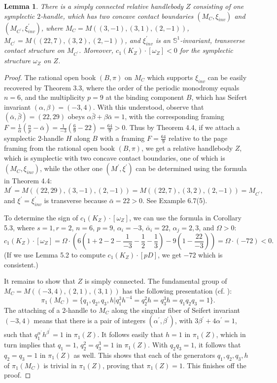 \documentclass[11pt]{amsart}
\theoremstyle{plain}
\numberwithin{theorem}{section}
\newtheorem{lemma}[theorem]{Lemma}
\theoremstyle{definition}
\newcommand{\s}{{\mathbb S}}
\begin{document}
\begin{lemma}
There is a simply connected relative handlebody $Z$ consisting of one symplectic $2$-handle, which has two concave contact boundaries $(M_C,\xi_{inv})$ and $(M_{C^\prime}, \xi_{inv}^\prime)$, where 
$M_C=M((3,-1), (3,1), (2,-1))$, $M_{C^\prime}=M((22,7), (3,2), (2,-1))$, and $\xi_{inv}^\prime$ is an $\s^1$-invariant, transverse contact structure on $M_{C^\prime}$. Moreover, $c_1(K_{Z})\cdot [\omega_{Z}]<0$ for the
symplectic structure $\omega_Z$ on $Z$.
\end{lemma}

\begin{proof}
The rational open book $(B,\pi)$ on $M_C$ which supports $\xi_{inv}$ can be easily recovered 
by Theorem 3.3, where the order of the periodic monodromy equals $n=6$, and the multiplicity
$p=9$ at the binding component $B$, which has Seifert invariant $(\alpha,\beta)=(-3,4)$.
With this understood, observe that $(\bar{\alpha},\bar{\beta})=(22, 29)$ obeys $\alpha\bar{\beta}
+\beta\bar{\alpha}=1$, with the corresponding framing $F=\frac{1}{\alpha}(\frac{n}{p}-\bar{\alpha})
=\frac{1}{-3}(\frac{6}{9}-22)=\frac{64}{9}>0$. Thus by Theorem 4.4, if we attach a symplectic
$2$-handle $H$ along $B$ with a framing $F=\frac{64}{9}$ relative to the page framing from the
rational open book $(B,\pi)$, we get a relative handlebody $Z$, which is symplectic with two
concave contact boundaries, one of which is $(M_C,\xi_{inv})$, while the other one 
$(M^\prime,\xi^\prime)$ can be determined using the formula in Theorem 4.4:
$$
M^\prime=M((22,29), (3,-1), (2,-1))=M((22,7), (3,2), (2,-1))=M_{C^\prime}, 
$$
and $\xi^\prime=\xi_{inv}^\prime$ is transverse because $\bar{\alpha}=22>0$. See Example 6.7(5). 

To determine the sign of $c_1(K_{Z})\cdot [\omega_{Z}]$, we can use the formula in Corollary 5.3,
where $s=1,r=2$, $n=6$, $p=9$, $\alpha_i=-3$, $\bar{\alpha}_i=22$, 
$\alpha_j=2,3$, and $\Omega>0$: 
$$
c_1(K_{Z})\cdot [\omega_{Z}]=\Omega \cdot 
(6(1+2-2-\frac{1}{-3}-\frac{1}{2}-\frac{1}{3})- 9(1-\frac{22}{-3}))=\Omega\cdot (-72)<0.
$$
(If we use Lemma 5.2 to compute $c_1(K_Z)\cdot [pD]$, we get $-72$ which is consistent.)

It remains to show that $Z$ is simply connected. The fundamental group of 
$M_C=M((-3,4), (2,1), (3,1))$ has the following presentation (cf. \cite{N}):
$$
\pi_1(M_C)=\{q_1,q_2,q_3,h| q_1^3 h^{-4}=q_2^2h=q_3^3 h=q_1q_2q_3=1\}.
$$
The attaching of a $2$-handle to $M_C$ along the singular fiber of Seifert invariant $(-3,4)$ means that there is a pair of integers $(\alpha^\prime,\beta^\prime)$, with $3\beta^\prime+4\alpha^\prime=1$, such that $q_1^{\alpha^\prime}h^{\beta^\prime}=1$ in $\pi_1(Z)$. It follows easily that $h=1$ in 
$\pi_1(Z)$, which in turn implies that $q_1=1$, $q_2^2=q_3^3=1$ in $\pi_1(Z)$. With $q_2q_3=1$, it follows that $q_2=q_3=1$ in $\pi_1(Z)$ as well. This shows that each of the generators $q_1,q_2,q_3,h$ of 
$\pi_1(M_C)$ is trivial in $\pi_1(Z)$, proving that $\pi_1(Z)=1$. This finishes off the proof. 

\end{proof}
\end{document}
